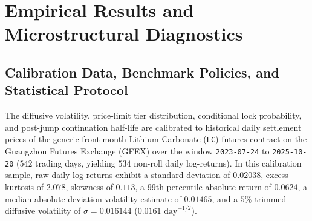 \documentclass[11pt,a4paper]{article}
\begin{document}
\section{Empirical Results and Microstructural Diagnostics}
\label{sec:results}

\subsection{Calibration Data, Benchmark Policies, and Statistical Protocol}
\label{sec:setup}
The diffusive volatility, price-limit tier distribution, conditional lock probability, and post-jump continuation half-life are calibrated to historical daily settlement prices of the generic front-month Lithium Carbonate (\texttt{LC}) futures contract on the Guangzhou Futures Exchange (GFEX) \citep{Kong2024,Wang2025} over the window \texttt{2023-07-24} to \texttt{2025-10-20} ($542$ trading days, yielding $534$ non-roll daily log-returns). In this calibration sample, raw daily log-returns exhibit a standard deviation of $0.02038$, excess kurtosis of $2.078$, skewness of $0.113$, a 99th-percentile absolute return of $0.0624$, a median-absolute-deviation volatility estimate of $0.01465$, and a $5\%$-trimmed diffusive volatility of $\sigma = 0.016144$ ($0.0161\text{ day}^{-1/2}$).
\end{document}
